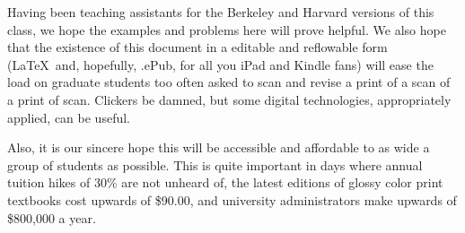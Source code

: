 Having been teaching assistants for the Berkeley and Harvard versions of this class, we hope the examples and problems here will prove helpful.  We also hope that the existence of this document in a editable and reflowable form (\LaTeX\ and, hopefully, .ePub, for all you iPad and Kindle fans) will ease the load on graduate students too often asked to scan and revise a print of a scan of a print of scan.  Clickers be damned, but some digital technologies, appropriately applied, can be useful.

Also, it is our sincere hope this will be accessible and affordable to as wide a group of students as possible.  This is quite important in days where annual tuition hikes of 30\% are not unheard of, the latest editions of glossy color print textbooks cost upwards of \$90.00, and university administrators make upwards of \$800,000 a year. 

